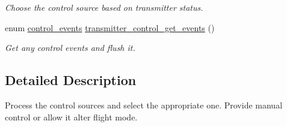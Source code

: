 \begin{DoxyCompactItemize}
\begin{DoxyCompactList}\small\item\em Choose the control source based on transmitter status. \end{DoxyCompactList}\item 
enum \hyperlink{group___control_ga6db279174b366abaad3f5de70b10655c}{control\-\_\-events} \hyperlink{group___control_module_ga51dc43f87515d8de90aebb1465578212}{transmitter\-\_\-control\-\_\-get\-\_\-events} ()
\begin{DoxyCompactList}\small\item\em Get any control events and flush it. \end{DoxyCompactList}\end{DoxyCompactItemize}


\subsection{Detailed Description}
Process the control sources and select the appropriate one. Provide manual control or allow it alter flight mode.

